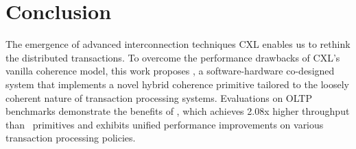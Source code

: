 

\section{Conclusion}
The emergence of advanced interconnection techniques CXL enables us to rethink the distributed transactions. To overcome the performance drawbacks of CXL's vanilla coherence model, this work proposes \name, a software-hardware co-designed system that implements a novel hybrid coherence primitive tailored to the loosely coherent nature of transaction processing systems. Evaluations on OLTP benchmarks demonstrate the benefits of \name, which achieves 2.08x higher throughput than \vanilla~primitives and exhibits unified performance improvements on various transaction processing policies. 

